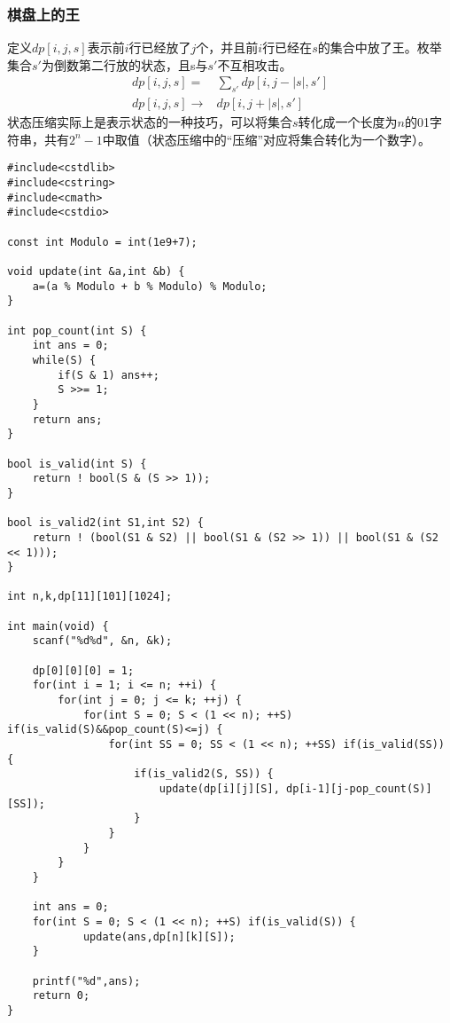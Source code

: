 \subsubsection{棋盘上的王}
定义$dp[i,j,s]$表示前$i$行已经放了$j$个，并且前$i$行已经在$s$的集合中放了王。枚举集合$s'$为倒数第二行放的状态，且s与$s'$不互相攻击。
\begin{equation*}
    \begin{aligned}
        dp[i,j,s]=&\sum_{s'}dp[i,j-|s|,s']\\
        dp[i,j,s]\to& dp[i,j+|s|,s']
    \end{aligned}
\end{equation*}
状态压缩实际上是表示状态的一种技巧，可以将集合$s$转化成一个长度为$n$的01字符串，共有$2^n-1$中取值（状态压缩中的“压缩”对应将集合转化为一个数字）。

\begin{verbatim}
#include<cstdlib>
#include<cstring>
#include<cmath>
#include<cstdio>

const int Modulo = int(1e9+7);

void update(int &a,int &b) {
    a=(a % Modulo + b % Modulo) % Modulo;
}

int pop_count(int S) {
    int ans = 0;
    while(S) {
        if(S & 1) ans++;
        S >>= 1;
    }
    return ans;
}

bool is_valid(int S) {
    return ! bool(S & (S >> 1));
}

bool is_valid2(int S1,int S2) {
    return ! (bool(S1 & S2) || bool(S1 & (S2 >> 1)) || bool(S1 & (S2 << 1)));
}

int n,k,dp[11][101][1024];

int main(void) {
    scanf("%d%d", &n, &k);

    dp[0][0][0] = 1;
    for(int i = 1; i <= n; ++i) {
        for(int j = 0; j <= k; ++j) {
            for(int S = 0; S < (1 << n); ++S) if(is_valid(S)&&pop_count(S)<=j) {
                for(int SS = 0; SS < (1 << n); ++SS) if(is_valid(SS)) {
                    if(is_valid2(S, SS)) {
                        update(dp[i][j][S], dp[i-1][j-pop_count(S)][SS]);
                    }
                }
            }
        }
    }

    int ans = 0;
    for(int S = 0; S < (1 << n); ++S) if(is_valid(S)) {
            update(ans,dp[n][k][S]);
    }

    printf("%d",ans);
    return 0;
}
\end{verbatim}


